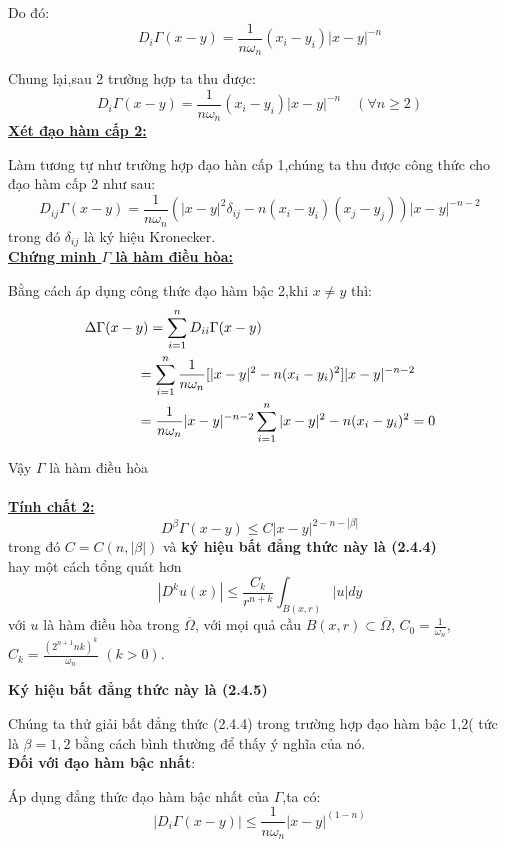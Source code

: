 Do đó:
\[
D_i \Gamma (x - y) = \frac{1}
{{n\omega _n }}(x_i  - y_i )|x - y|^{ - n} 
\]

Chung lại,sau 2 trường hợp ta thu được:
\[D_i \Gamma (x - y) = \frac{1}
{{n\omega _n }}(x_i  - y_i )|x - y|^{ - n} \quad (\forall n  \geqslant 2
)\]
\textbf{\underline{Xét đạo hàm cấp 2:}}

 Làm tương tự như trường hợp đạo hàn cấp 1,chúng ta thu được công thức cho đạo hàm cấp 2 như sau:
\[D_{ij} \Gamma (x - y) = \frac{1}
{{n\omega _n }}(|x - y|^2 \delta _{ij}  - n(x_i  - y_i )(x_j  - y_j ))|x - y|^{ - n - 2} 
\]
trong đó $\delta _{ij}$ là ký hiệu Kronecker.\\
\textbf{\underline{Chứng minh $\Gamma$ là hàm điều hòa:}}

Bằng cách áp dụng công thức đạo hàm bậc 2,khi $x \ne y$ thì:
 \[
\begin{gathered}
  \Delta \Gamma (x - y) = \sum\limits_{i = 1}^n {D_{ii} } \Gamma (x - y) \hfill \\
  \quad \quad \quad \quad  = \sum\limits_{i = 1}^n {\frac{1}
{{n\omega _n }}[|x - y|^2  - n(x_i  - y_i )^2 ]|x - y|^{ - n - 2} }  \hfill \\
  \quad \quad \quad \quad  = \frac{1}
{{n\omega _n }}|x - y|^{ - n - 2} \sum\limits_{i = 1}^n {|x - y|^2  - n(x_i  - y_i )^2  = 0}  \hfill \\
\end{gathered} 
\]

Vậy $\Gamma$ là hàm điều hòa
\\
\\
\textbf{\underline{Tính chất 2:}}
\[
D^\beta  \Gamma (x - y) \le C|x - y|^{2 - n - |\beta |} 
\]
trong đó $C = C(n,|\beta |)$ và \textbf{ký hiệu bất đẳng thức này là (2.4.4)}\\
hay một cách tổng quát hơn
\[
|D^k u(x)| \leqslant \frac{{C_k }}
{{r^{n + k} }}\int_{B(x,r)} {|u|dy} 
\]
với $u$ là hàm điều hòa trong $ \overline { \Omega } $, với mọi quả cầu $B(x,r) \subset \overline { \Omega }$, $
C_0  = \frac{1}{{\omega _n }}
$,
$
C_k  = \frac{(2^{n + 1} nk)^k }
{\omega _n }$  $(k > 0)$. 

\textbf{Ký hiệu bất đẳng thức này là (2.4.5)}

Chúng ta thử giải bất đẳng thức (2.4.4) trong trường hợp đạo hàm bậc 1,2( tức là $\beta  = 1,2$ bằng cách bình thường để thấy ý nghĩa của nó.
\\
\textbf{Đối với đạo hàm bậc nhất}:

Áp dụng đẳng thức đạo hàm bậc nhất của $\Gamma$,ta có:
\[
\left| {D_i \Gamma (x - y)} \right| \le \frac{1}{{n\omega _n }}|x - y|^{(1 - n)} 
\]

